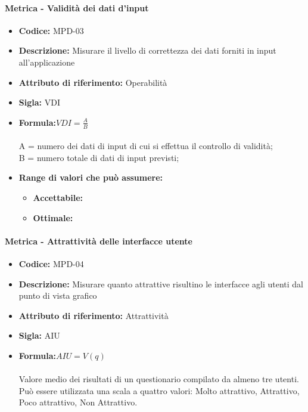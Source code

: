 	 \paragraph{Metrica - Validità dei dati d'input} 
	    \begin{itemize}
          \item  \textbf{Codice: } MPD-03
           \item \textbf{Descrizione:} Misurare il livello di correttezza dei dati forniti in input all'applicazione
         \item   \textbf{Attributo di riferimento:} Operabilità
          \item  \textbf{Sigla:} VDI
         \item   \textbf{Formula:}\begin{math} VDI = \frac{A}{B}\end{math}\\ \\
             A = numero dei dati di input di cui si effettua il controllo di validità;\\
             B = numero totale di dati di input previsti;
                   \item \textbf{Range di valori che può assumere:}
        \begin{itemize}
            \item \textbf{Accettabile:} 
            \item \textbf{Ottimale:} 
        \end{itemize}
       \end{itemize}
              
          
           
                   \paragraph{Metrica - Attrattività delle interfacce utente} 
                      \begin{itemize}
          \item  \textbf{Codice: } MPD-04
          \item  \textbf{Descrizione:} Misurare quanto attrattive risultino le interfacce agli utenti dal punto di vista grafico 
          \item  \textbf{Attributo di riferimento:} Attrattività
          \item  \textbf{Sigla:} AIU
           \item \textbf{Formula:}\begin{math}AIU = V (q) \end{math}\\ \\
             Valore medio dei risultati di un questionario compilato da almeno tre utenti.\\
         Può essere utilizzata una scala a quattro valori: Molto attrattivo, Attrattivo, Poco attrattivo, Non Attrattivo.
           \end{itemize}
         
